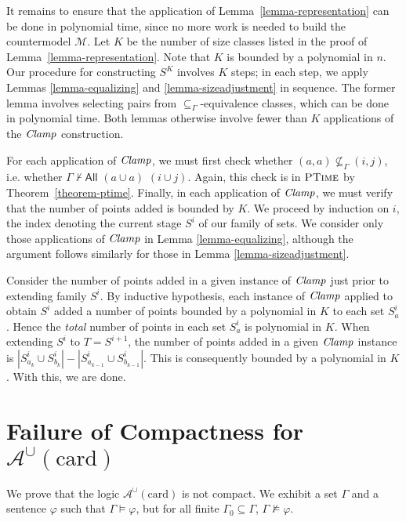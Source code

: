 \documentclass[letterpaper]{article} %
\theoremstyle{definition}
\newcommand{\Model}{\mathcal{M}}
\newcommand{\proves}{\vdash}
\renewcommand{\phi}{\varphi}
\newcommand{\Aunion}{\mathscr{A}^{\cup}}
\newcommand{\Ptime}{\textsc{PTime}}
\newcommand{\All}[2]{\mathsf{All}\,\,#1\,\,#2}
\newcommand{\card}{\mathrm{card}}
\newcommand{\Clamp}{\protect{\mbox{\textit{Clamp}}}}
\newcommand{\provsub}{\subseteq_{\Gamma}}
\begin{document}
It remains to ensure that the application of Lemma~\ref{lemma-representation} can be done in polynomial time, since no more work is needed to build the countermodel $\Model$.  Let $K$ be the number of size classes listed in the proof of Lemma~\ref{lemma-representation}.  Note that $K$ is bounded by a polynomial in $n$.  Our procedure for constructing $S^K$ involves $K$ steps; in each step, we apply Lemmas \ref{lemma-equalizing} and \ref{lemma-sizeadjustment} in sequence.  The former lemma involves selecting pairs from $\provsub$-equivalence classes, which can be done in polynomial time.  Both lemmas otherwise involve fewer than $K$ applications of the $\Clamp$ construction.  

For each application of $\Clamp$, we must first check whether $(a, a) \not \provsub (i, j)$, i.e. whether $\Gamma \not \proves \All{(a \cup a)}{(i \cup j)}.$   Again, this check is in $\Ptime$ by Theorem~\ref{theorem-ptime}.
Finally, in each application of $\Clamp$, we must verify that the number of points added is bounded by $K$.  We proceed by induction on $i$, the index denoting the current stage $S^i$ of our family of sets.  We consider only those applications of $\Clamp$ in Lemma \ref{lemma-equalizing}, although the argument follows similarly for those in Lemma \ref{lemma-sizeadjustment}.

Consider the number of points added in a given instance of $\Clamp$ just prior to extending family $S^i$.  By inductive hypothesis, each instance of $\Clamp$ applied to obtain $S^i$ added a number of points bounded by a polynomial in $K$ to each set $S^i_a$.  Hence the \textit{total} number of points in each set $S^i_a$ is polynomial in $K$.  When extending $S^i$ to $T = S^{i+1}$, the number of points added in a given $\Clamp$ instance is $|S^i_{a_k} \cup S^i_{b_k}| - |S^i_{a_{k-1}} \cup S^i_{b_{k-1}}|$.  This is consequently bounded by a polynomial in $K$.
With this, we are done.



\section{Failure of Compactness for $\Aunion(\card)$}
\label{s:supp:non-compact}

We prove that the logic $\Aunion(\card)$ is  not compact.
We exhibit a set $\Gamma$ and a sentence $\phi$
 such that
 $\Gamma\models\phi$, but for all finite $\Gamma_0\subseteq\Gamma$,
 $\Gamma\not\models\phi$. 
 
\end{document}
